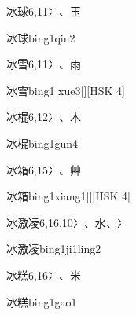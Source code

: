 \begin{entry}{冰球}{6,11}{⼎、⽟}
  \begin{phonetics}{冰球}{bing1qiu2}
  \end{phonetics}
\end{entry}

\begin{entry}{冰雪}{6,11}{⼎、⾬}
  \begin{phonetics}{冰雪}{bing1 xue3}[][HSK 4]
  \end{phonetics}
\end{entry}

\begin{entry}{冰棍}{6,12}{⼎、⽊}
  \begin{phonetics}{冰棍}{bing1gun4}
  \end{phonetics}
\end{entry}

\begin{entry}{冰箱}{6,15}{⼎、⾋}
  \begin{phonetics}{冰箱}{bing1xiang1}[][HSK 4]
  \end{phonetics}
\end{entry}

\begin{entry}{冰激凌}{6,16,10}{⼎、⽔、⼎}
  \begin{phonetics}{冰激凌}{bing1ji1ling2}
  \end{phonetics}
\end{entry}

\begin{entry}{冰糕}{6,16}{⼎、⽶}
  \begin{phonetics}{冰糕}{bing1gao1}
  \end{phonetics}
\end{entry}

